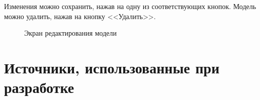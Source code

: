 \documentclass{../includes/TechDoc}
\begin{document}
    Изменения можно сохранить, нажав на одну из соответствующих кнопок.
    Модель можно удалить, нажав на кнопку <<Удалить>>.
    \begin{figure}[ht]
        \centering
        \caption{Экран редактирования модели}
        \label{ris:admin_model_edit}
    \end{figure}

    \clearpage


    \section{Источники, использованные при разработке}
\end{document}

